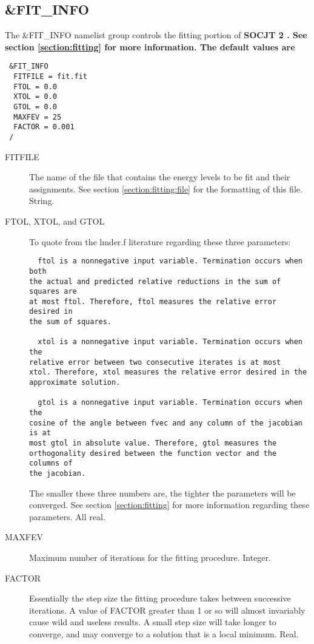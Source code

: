\documentclass{article}
\newcommand{\socjttwo}{\bf{SOCJT 2}}
\begin{document}
\subsection{\&FIT\_INFO} \label{fitinfo}

The \&FIT\_INFO namelist group controls the fitting portion of \socjttwo
. See section \ref{section:fitting} for more information. The default values are

\begin{verbatim}
 &FIT_INFO
  FITFILE = fit.fit
  FTOL = 0.0
  XTOL = 0.0
  GTOL = 0.0
  MAXFEV = 25
  FACTOR = 0.001
 /
\end{verbatim}

\begin{description}

\item[FITFILE] The name of the file that contains the energy levels
  to be fit and their assignments.  See section \ref{section:fitting:file} for
  the formatting of this file. String.

\item[FTOL, XTOL, and GTOL] To quote from the lmder.f
  literature regarding these three parameters:
  \begin{verbatim}
  ftol is a nonnegative input variable. Termination occurs when both
the actual and predicted relative reductions in the sum of squares are
at most ftol. Therefore, ftol measures the relative error desired in
the sum of squares. 

  xtol is a nonnegative input variable. Termination occurs when the
relative error between two consecutive iterates is at most
xtol. Therefore, xtol measures the relative error desired in the
approximate solution. 

  gtol is a nonnegative input variable. Termination occurs when the
cosine of the angle between fvec and any column of the jacobian is at
most gtol in absolute value. Therefore, gtol measures the
orthogonality desired between the function vector and the columns of
the jacobian. 
 \end{verbatim}

 The smaller these three numbers are, the tighter the parameters will
 be converged. See section \ref{section:fitting} for more
 information regarding these parameters. All real.

\item[MAXFEV] Maximum number of iterations for the fitting
  procedure. Integer.

\item[FACTOR] Essentially the step size the fitting procedure takes
  between successive iterations. A value of FACTOR greater than 1 or
  so will almost invariably cause wild and useless results. A small
  step size will take longer to converge, and may converge to a
  solution that is a local minimum. Real.

\end{description}
\end{document}
